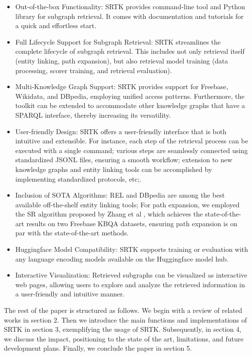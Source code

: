 \documentclass[runningheads]{llncs}
\begin{document}
\begin{itemize}
    \item Out-of-the-box Functionality: SRTK provides command-line tool and Python library for subgraph retrieval. It comes with documentation and tutorials for a quick and effortless start.
    \item Full Lifecycle Support for Subgraph Retrieval: SRTK streamlines the complete lifecycle of subgraph retrieval.  This includes not only retrieval itself (entity linking, path expansion), but also retrieval model training (data processing, scorer training, and retrieval evaluation).
    \item Multi-Knowledge Graph Support: SRTK provides support for Freebase, Wikidata, and DBpedia, employing unified access patterns. Furthermore, the toolkit can be extended to accommodate other knowledge graphs that have a SPARQL interface, thereby increasing its versatility.
    \item User-friendly Design: SRTK offers a user-friendly interface that is both intuitive and extensible. For instance, each step of the retrieval process can be executed with a single command; various steps are seamlessly connected using standardized JSONL files, ensuring a smooth workflow; extension to new knowledge graphs and entity linking tools can be accomplished by implementing standardized protocols, etc;.
    \item Inclusion of SOTA Algorithms: REL and DBpedia are among the best available off-the-shelf entity linking tools; For path expansion, we employed the SR algorithm proposed by Zhang et al \cite{zhang2022ruckbqa}, which achieves the state-of-the-art results on two Freebase KBQA datasets, ensuring path expansion is on par with the state-of-the-art methods.
    \item Huggingface Model Compatibility: SRTK supports training or evaluation with any language encoding models available on the Huggingface model hub.
    \item Interactive Visualization: Retrieved subgraphs can be visualized as interactive web pages, allowing users to explore and analyze the retrieved information in a user-friendly and intuitive manner.
\end{itemize}

The rest of the paper is structured as follows. We begin with a review of related works in section 2. Then we introduce the main functions and implementations of SRTK in section 3, exemplifying the usage of SRTK.  Subsequently, in section 4, we discuss the impact, positioning to the state of the art, limitations, and future development plans. Finally, we conclude the paper in section 5.
\end{document}
